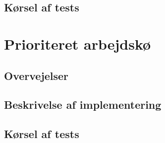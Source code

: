 \documentclass{article}
\begin{document}
\subsection{Kørsel af tests}
\section{Prioriteret arbejdskø}
\subsection{Overvejelser}
\subsection{Beskrivelse af implementering}
\subsection{Kørsel af tests}
\end{document}
